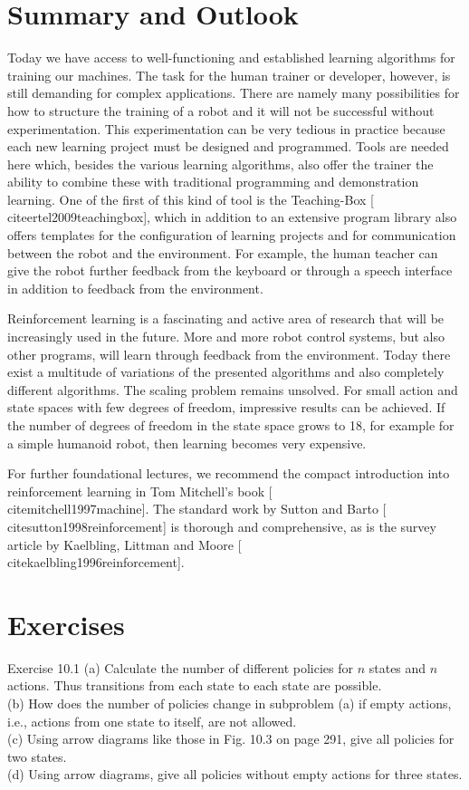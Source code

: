 \documentclass[10pt]{book}
\begin{document}
\section{Summary and Outlook}
Today we have access to well-functioning and established learning algorithms for training our machines. The task for the human trainer or developer, however, is still demanding for complex applications. There are namely many possibilities for how to structure the training of a robot and it will not be successful without experimentation. This experimentation can be very tedious in practice because each new learning project must be designed and programmed. Tools are needed here which, besides the various learning algorithms, also offer the trainer the ability to combine these with traditional programming and demonstration learning. One of the first of this kind of tool is the Teaching-Box [\\cite{ertel2009teachingbox}], which in addition to an extensive program library also offers templates for the configuration of learning projects and for communication between the robot and the environment. For example, the human teacher can give the robot further feedback from the keyboard or through a speech interface in addition to feedback from the environment.


Reinforcement learning is a fascinating and active area of research that will be increasingly used in the future. More and more robot control systems, but also other programs, will learn through feedback from the environment. Today there exist a multitude of variations of the presented algorithms and also completely different algorithms. The scaling problem remains unsolved. For small action and state spaces with few degrees of freedom, impressive results can be achieved. If the number of degrees of freedom in the state space grows to 18, for example for a simple humanoid robot, then learning becomes very expensive.

For further foundational lectures, we recommend the compact introduction into reinforcement learning in Tom Mitchell's book [\\cite{mitchell1997machine}]. The standard work by Sutton and Barto [\\cite{sutton1998reinforcement}] is thorough and comprehensive, as is the survey article by Kaelbling, Littman and Moore [\\cite{kaelbling1996reinforcement}].

\section{Exercises}
Exercise 10.1
(a) Calculate the number of different policies for $n$ states and $n$ actions. Thus transitions from each state to each state are possible.\\
(b) How does the number of policies change in subproblem (a) if empty actions, i.e., actions from one state to itself, are not allowed.\\
(c) Using arrow diagrams like those in Fig. 10.3 on page 291, give all policies for two states.\\
(d) Using arrow diagrams, give all policies without empty actions for three states.
\end{document}
